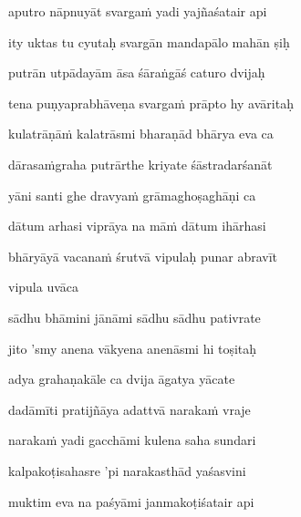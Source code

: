 aputro nāpnuyāt svarga\.m yadi yajñaśatair api \veg\dontdisplaylinenum

ity uktas tu cyutaḥ svargān mandapālo mahān ṣiḥ\thinspace{\dandab} \dontdisplaylinenum

putrān utpādayām āsa śāraṅgāś caturo dvijaḥ \veg\dontdisplaylinenum

tena puṇyaprabhāveṇa svarga\.m prāpto hy avāritaḥ\thinspace{\dandab} \dontdisplaylinenum

kulatrāṇā\.m kalatrāsmi bharaṇād bhārya eva ca \veg\dontdisplaylinenum

dārasa\.mgraha putrārthe kriyate śāstradarśanāt\thinspace{\dandab} \dontdisplaylinenum

yāni santi ghe dravya\.m grāmaghoṣaghāṇi ca \veg\dontdisplaylinenum

dātum arhasi viprāya na mā\.m dātum ihārhasi\thinspace{\dandab} \dontdisplaylinenum

bhāryāyā vacana\.m śrutvā vipulaḥ punar abravīt \veg\dontdisplaylinenum

vipula uvāca~{\dandab}\dontdisplaylinenum 

sādhu bhāmini jānāmi sādhu sādhu pativrate\thinspace{\danda} \dontdisplaylinenum

jito 'smy anena vākyena anenāsmi hi toṣitaḥ \veg\dontdisplaylinenum

adya grahaṇakāle ca dvija āgatya yācate\thinspace{\dandab} \dontdisplaylinenum

dadāmīti pratijñāya adattvā naraka\.m vraje \veg\dontdisplaylinenum

naraka\.m yadi gacchāmi kulena saha sundari\thinspace{\dandab} \dontdisplaylinenum

kalpakoṭisahasre 'pi narakasthād yaśasvini \veg\dontdisplaylinenum
            \var{\vd °sthād\lem  \msCa; sthā \msCb, °stho \Ed}%

muktim eva na paśyāmi janmakoṭiśatair api\thinspace{\dandab} \dontdisplaylinenum

